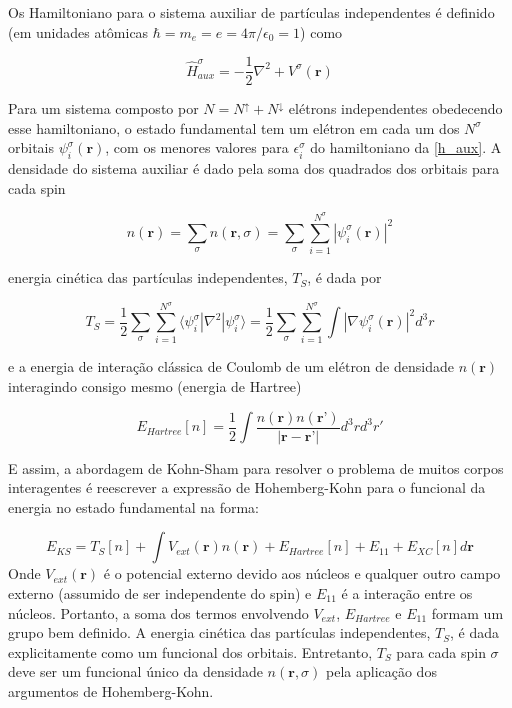 	Os Hamiltoniano para o sistema auxiliar de partículas independentes é definido (em unidades atômicas $\hbar=m_e=e=4\pi/\epsilon_0 = 1$) como
	
	\begin{equation}
		\hat{H}_{aux}^\sigma = -\frac{1}{2}\nabla^2 + V^\sigma (\textbf{r})
		\label{h_aux}
	\end{equation}
	
	Para um sistema composto por $N = N^\uparrow + N^\downarrow$ elétrons independentes obedecendo esse hamiltoniano, o estado fundamental tem um elétron em cada um dos $N^\sigma$ orbitais $\psi_i^\sigma (\textbf{r})$, com os menores valores para $\epsilon_i^\sigma$ do hamiltoniano da \autoref{h_aux}. A densidade do sistema auxiliar é dado pela soma dos quadrados dos orbitais para cada spin
	
	\begin{equation}
		n(\textbf{r}) = \sum_\sigma n(\textbf{r}, \sigma) = \sum_\sigma \sum_{i=1}^{N^\sigma}|\psi_i^\sigma (\textbf{r})|^2
		\label{rho_aux}
	\end{equation}
	
	energia cinética das partículas independentes, $T_S$, é dada por
	
	\begin{equation}
		T_S = \frac{1}{2}\sum_\sigma \sum_{i=1}^{N^\sigma}\langle \psi_i^\sigma|\nabla^2|\psi_i^\sigma\rangle =  \frac{1}{2}\sum_\sigma \sum_{i=1}^{N^\sigma} \int |\nabla \psi_i^\sigma(\textbf{r})|^2 d^3r
		\label{ts}
	\end{equation}
	
	e a energia de interação clássica de Coulomb de um elétron de densidade $n(\textbf{r})$ interagindo consigo mesmo (energia de Hartree)
	
	\begin{equation}
		E_{Hartree}[n] = \frac{1}{2}\int \frac{n(\textbf{r}) n(\textbf{r'})}{|\textbf{r} - \textbf{r'}|}d^3rd^3r'
		\label{ehartree}
	\end{equation}
	
	E assim, a abordagem de Kohn-Sham para resolver o problema de muitos corpos interagentes é reescrever a expressão de Hohemberg-Kohn para o funcional da energia no estado fundamental na forma:
	
	\begin{equation}
		E_{KS} = T_S[n] + \int V_{ext}(\textbf{r})n(\textbf{r}) + E_{Hartree}[n] + E_{11} + E_{XC}[n] d\textbf{r} 
		\label{E_KS}
	\end{equation}
	Onde $V_{ext}(\textbf{r})$ é o potencial externo devido aos núcleos e qualquer outro campo externo (assumido de ser independente do spin) e $E_{11}$ é a interação entre os núcleos. Portanto, a soma dos termos envolvendo $V_{ext}$, $E_{Hartree}$ e $E_{11}$ formam um grupo bem definido. A energia cinética das partículas independentes, $T_S$, é dada explicitamente como um funcional dos orbitais. Entretanto, $T_S$ para cada spin $\sigma$ deve ser um funcional único da densidade $n(\textbf{r}, \sigma)$ pela aplicação dos argumentos de Hohemberg-Kohn. 
	
